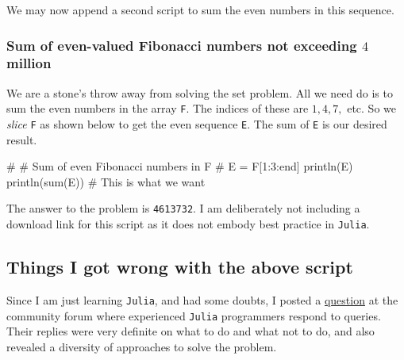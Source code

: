 \documentclass[
  a4paper,
]{article}
\newenvironment{Shaded}{\begin{snugshade}}{\end{snugshade}}
\newcommand{\CommentTok}[1]{\textcolor[rgb]{0.50,0.62,0.50}{#1}}
\newcommand{\FloatTok}[1]{\textcolor[rgb]{0.75,0.75,0.82}{#1}}
\newcommand{\FunctionTok}[1]{\textcolor[rgb]{0.94,0.94,0.56}{#1}}
\newcommand{\KeywordTok}[1]{\textcolor[rgb]{0.94,0.87,0.69}{#1}}
\newcommand{\NormalTok}[1]{\textcolor[rgb]{0.80,0.80,0.80}{#1}}
\newcommand{\OperatorTok}[1]{\textcolor[rgb]{0.94,0.94,0.82}{#1}}
\begin{document}
We may now append a second script to sum the even numbers in this
sequence.

\hypertarget{sum-of-even-valued-fibonacci-numbers-not-exceeding-4-million}{%
\subsubsection{\texorpdfstring{Sum of even-valued Fibonacci numbers not
exceeding \(4\)
million}{Sum of even-valued Fibonacci numbers not exceeding 4 million}}\label{sum-of-even-valued-fibonacci-numbers-not-exceeding-4-million}}

We are a stone's throw away from solving the set problem. All we need do
is to sum the even numbers in the array \texttt{F}. The indices of these
are \(1, 4, 7,\) etc. So we \emph{slice} \texttt{F} as shown below to
get the even sequence \texttt{E}. The sum of \texttt{E} is our desired
result.

\begin{Shaded}
\begin{Highlighting}[]
\CommentTok{\#}
\CommentTok{\# Sum of even Fibonacci numbers in F}
\CommentTok{\#}
\NormalTok{E }\OperatorTok{=}\NormalTok{ F[}\FloatTok{1}\OperatorTok{:}\FloatTok{3}\OperatorTok{:}\KeywordTok{end}\NormalTok{]}
\FunctionTok{println}\NormalTok{(E)}
\FunctionTok{println}\NormalTok{(}\FunctionTok{sum}\NormalTok{(E)) }\CommentTok{\# This is what we want}
\end{Highlighting}
\end{Shaded}

The answer to the problem is \texttt{4613732}. I am deliberately not
including a download link for this script as it does not embody best
practice in \texttt{Julia}.

\hypertarget{things-i-got-wrong-with-the-above-script}{%
\subsection{Things I got wrong with the above
script}\label{things-i-got-wrong-with-the-above-script}}

Since I am just learning \texttt{Julia}, and had some doubts, I posted a
\href{https://discourse.julialang.org/t/is-it-possible-to-suppres-the-printing-of-any-before-an-array-is-printed/106930}{question}
at the community forum where experienced \texttt{Julia} programmers
respond to queries. Their replies were very definite on what to do and
what not to do, and also revealed a diversity of approaches to solve the
problem.
\end{document}
